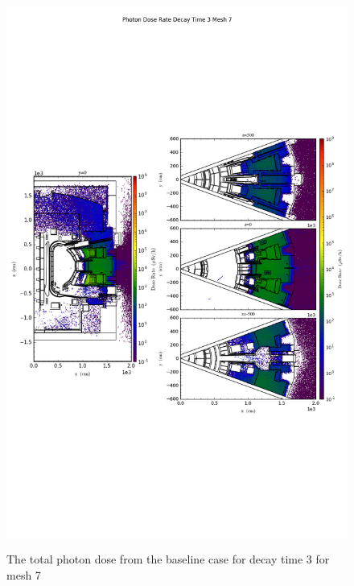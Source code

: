 \begin{figure}[ht!]
\centering
\includegraphics[trim={0cm 9cm 0cm 10cm},clip,scale=0.75]{../plots/final_model_nob4c/Photon_Dose_Rate_Decay_Time_3_Mesh_7.png}
\label{fig:photons_dc3_no4bc_m7_flux}
\caption{The total photon dose from the baseline case for decay time 3 for mesh 7}
\end{figure}
